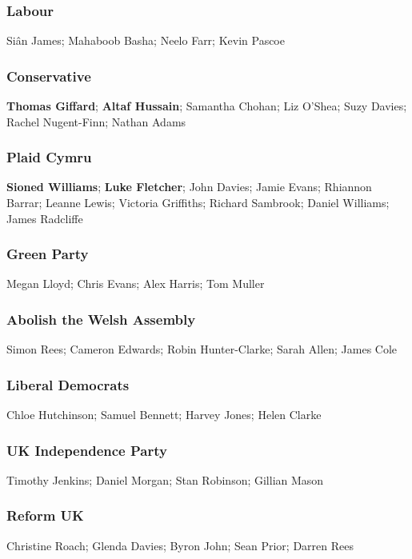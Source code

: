 \begin{resultsiii}
	\subsubsection*{Labour}
	Siân James; Mahaboob Basha; Neelo Farr; Kevin Pascoe
	
	\subsubsection*{Conservative}
	\textbf{Thomas Giffard}; \textbf{Altaf Hussain}; Samantha Chohan; Liz O'Shea; Suzy Davies; Rachel Nugent-Finn; Nathan Adams
	
	\subsubsection*{Plaid Cymru}
	\textbf{Sioned Williams}; \textbf{Luke Fletcher}; John Davies; Jamie Evans; Rhiannon Barrar; Leanne Lewis; Victoria Griffiths; Richard Sambrook; Daniel Williams; James Radcliffe
	
	\subsubsection*{Green Party}
	Megan Lloyd; Chris Evans; Alex Harris; Tom Muller
	
	\subsubsection*{Abolish the Welsh Assembly}
	Simon Rees; Cameron Edwards; Robin Hunter-Clarke; Sarah Allen; James Cole
	
	\subsubsection*{Liberal Democrats}
	Chloe Hutchinson; Samuel Bennett; Harvey Jones; Helen Clarke
	
	\subsubsection*{UK Independence Party}
	Timothy Jenkins; Daniel Morgan; Stan Robinson; Gillian Mason
	
	\subsubsection*{Reform UK}
	Christine Roach; Glenda Davies; Byron John; Sean Prior; Darren Rees
	

\end{resultsiii}
